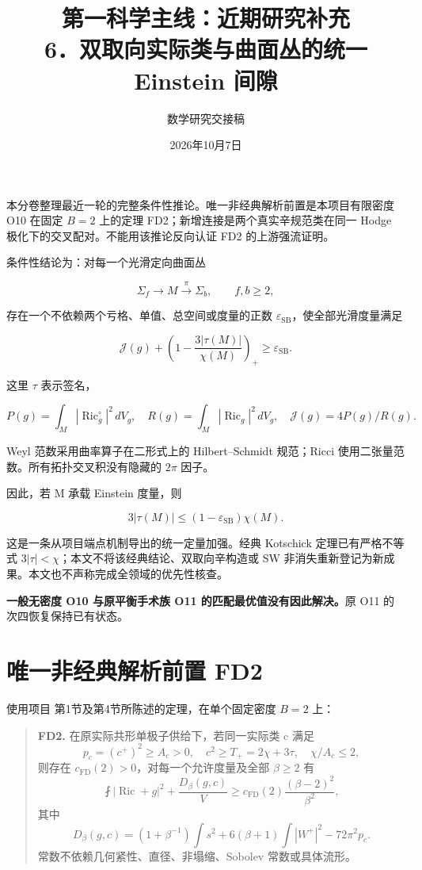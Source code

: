 \documentclass[UTF8,11pt,fontset=none]{ctexart}
\title{第一科学主线：近期研究补充\\[6pt]\large 6．双取向实际类与曲面丛的统一 Einstein 间隙}
\author{数学研究交接稿}\date{2026年10月7日}
\theoremstyle{definition}
\theoremstyle{remark}
\begin{document}
\maketitle
\tableofcontents
\clearpage
本分卷整理最近一轮的完整条件性推论。唯一非经典解析前置是本项目有限密度 O10 在固定 \(B=2\) 上的定理 FD2；新增连接是两个真实辛规范类在同一 Hodge 极化下的交叉配对。不能用该推论反向认证 FD2 的上游强流证明。\cite{R05,I02,Kotschick1999,LeBrun2000}

条件性结论为：对每一个光滑定向曲面丛

\[
\Sigma_f\longrightarrow M\stackrel\pi\longrightarrow\Sigma_b,
\qquad f,b\ge2,
\]

存在一个不依赖两个亏格、单值、总空间或度量的正数 \(\varepsilon_{\mathrm{SB}}\)，使全部光滑度量满足

\[
\boxed{\mathcal J(g)+\left(1-\frac{3|\tau(M)|}{\chi(M)}\right)_+
\ge\varepsilon_{\mathrm{SB}}.}
\tag{6.T}
\]

这里 \(\tau\) 表示签名，

\[
P(g)=\int_M|\operatorname{Ric}^{\circ}_g|^2\,dV_g,\quad
R(g)=\int_M|\operatorname{Ric}_g|^2\,dV_g,\quad
\mathcal J(g)=4P(g)/R(g).
\]

Weyl 范数采用曲率算子在二形式上的 Hilbert--Schmidt 规范；Ricci 使用二张量范数。所有拓扑交叉积没有隐藏的 \(2\pi\) 因子。

因此，若 M 承载 Einstein 度量，则

\[
\boxed{3|\tau(M)|\le(1-\varepsilon_{\mathrm{SB}})\chi(M).}
\tag{6.E}
\]

这是一条从项目端点机制导出的统一定量加强。经典 Kotschick 定理已有严格不等式 \(3|\tau|<\chi\)；本文不将该经典结论、双取向辛构造或 SW 非消失重新登记为新成果。本文也不声称完成全领域的优先性核查。

\textbf{一般无密度 O10 与原平衡手术族 O11 的匹配最优值没有因此解决。}原 O11 的次四恢复保持已有状态。

\section{唯一非经典解析前置 FD2}\label{v6-ux552fux4e00ux975eux7ecfux5178ux89e3ux6790ux524dux7f6e-fd2}

使用项目  第1节及第4节所陈述的定理，在单个固定密度 \(B=2\) 上：

\begin{quote}
\textbf{FD2.} 在原实际共形单极子供给下，若同一实际类 c 满足 \[
p_c=(c^+)^2\ge A_c>0,\quad c^2\ge T_+=2\chi+3\tau,
\quad\chi/A_c\le2,
\] 则存在 \(c_{\mathrm{FD}}(2)>0\)，对每一个允许度量及全部 \(\beta\ge2\) 有 \[
\fint|\operatorname{Ric}+g|^2+\frac{D_\beta(g,c)}V
\ge c_{\mathrm{FD}}(2)\frac{(\beta-2)^2}{\beta^2},
\] 其中 \[
D_\beta(g,c)=(1+\beta^{-1})\int s^2
+6(\beta+1)\int|W^+|^2-72\pi^2p_c.
\] 常数不依赖几何紧性、直径、非塌缩、Sobolev 常数或具体流形。
\end{quote}
\end{document}
